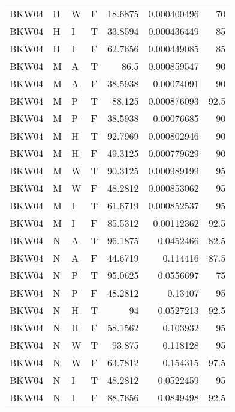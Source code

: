 \begin{table}[htb!]
{\begin{tabular}{llllrrr}
            BKW04    & H     & W     & F          & 18.6875    & 0.000400496 & 70       \\
            BKW04    & H     & I     & T          & 33.8594    & 0.000436449 & 85       \\
            BKW04    & H     & I     & F          & 62.7656    & 0.000449085 & 85       \\
            BKW04    & M     & A     & T          & 86.5       & 0.000859547 & 90       \\
            BKW04    & M     & A     & F          & 38.5938    & 0.00074091  & 90       \\
            BKW04    & M     & P     & T          & 88.125     & 0.000876093 & 92.5     \\
            BKW04    & M     & P     & F          & 38.5938    & 0.00076685  & 90       \\
            BKW04    & M     & H     & T          & 92.7969    & 0.000802946 & 90       \\
            BKW04    & M     & H     & F          & 49.3125    & 0.000779629 & 90       \\
            BKW04    & M     & W     & T          & 90.3125    & 0.000989199 & 95       \\
            BKW04    & M     & W     & F          & 48.2812    & 0.000853062 & 95       \\
            BKW04    & M     & I     & T          & 61.6719    & 0.000852537 & 95       \\
            BKW04    & M     & I     & F          & 85.5312    & 0.00112362  & 92.5     \\
            BKW04    & N     & A     & T          & 96.1875    & 0.0452466   & 82.5     \\
            BKW04    & N     & A     & F          & 44.6719    & 0.114416    & 87.5     \\
            BKW04    & N     & P     & T          & 95.0625    & 0.0556697   & 75       \\
            BKW04    & N     & P     & F          & 48.2812    & 0.13407     & 95       \\
            BKW04    & N     & H     & T          & 94         & 0.0527213   & 92.5     \\
            BKW04    & N     & H     & F          & 58.1562    & 0.103932    & 95       \\
            BKW04    & N     & W     & T          & 93.875     & 0.118128    & 95       \\
            BKW04    & N     & W     & F          & 63.7812    & 0.154315    & 97.5     \\
            BKW04    & N     & I     & T          & 48.2812    & 0.0522459   & 95       \\
            BKW04    & N     & I     & F          & 88.7656    & 0.0849498   & 92.5     \\
            \hline
        \end{tabular}
    }{
    }
\end{table} 

